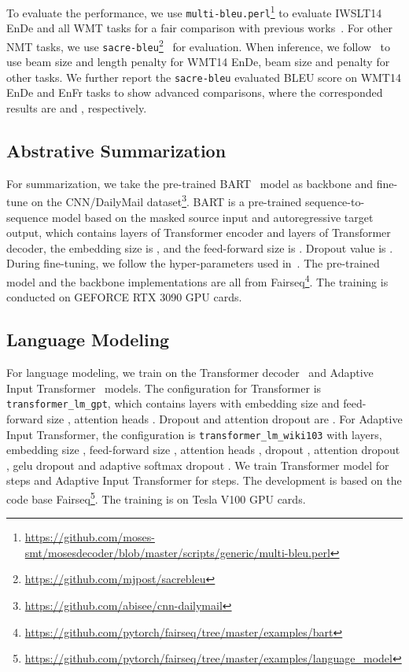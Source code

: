 \documentclass{article}
\begin{document}
To evaluate the performance, we use \texttt{multi-bleu.perl}\footnote{\url{https://github.com/moses-smt/mosesdecoder/blob/master/scripts/generic/multi-bleu.perl}} to evaluate IWSLT14 EnDe and all WMT tasks for a fair comparison with previous works~\cite{zhu2019incorporating,ott2018scaling}. For other NMT tasks, we use \texttt{sacre-bleu}\footnote{\url{https://github.com/mjpost/sacrebleu}}~\cite{post2018call} for evaluation. When inference, we follow~\cite{vaswani2017attention} to use beam size  and length penalty  for WMT14 EnDe, beam size  and penalty  for other tasks. We further report the \texttt{sacre-bleu} evaluated BLEU score on WMT14 EnDe and EnFr tasks to show advanced comparisons, where the corresponded results are  and , respectively. 

\subsection{Abstrative Summarization}
For summarization, we take the pre-trained BART~\cite{lewis2020bart} model as backbone and fine-tune on the CNN/DailyMail dataset\footnote{\url{https://github.com/abisee/cnn-dailymail}}. BART is a pre-trained sequence-to-sequence model based on the masked source input and autoregressive target output, which contains  layers of Transformer encoder and  layers of Transformer decoder, the embedding size is , and the feed-forward size is . Dropout value is . During fine-tuning, we follow the hyper-parameters used in~\cite{lewis2020bart}. The pre-trained model and the backbone implementations are all from Fairseq\footnote{\url{https://github.com/pytorch/fairseq/tree/master/examples/bart}}. The training is conducted on  GEFORCE RTX 3090 GPU cards.

\subsection{Language Modeling}
For language modeling, we train on the Transformer decoder~\cite{vaswani2017attention} and Adaptive Input Transformer~\cite{baevski2018adaptive} models. The configuration for Transformer is \texttt{transformer\_lm\_gpt}, which contains  layers with embedding size  and feed-forward size , attention heads . Dropout and attention dropout are . For Adaptive Input Transformer, the configuration is \texttt{transformer\_lm\_wiki103} with  layers, embedding size , feed-forward size , attention heads , dropout , attention dropout , gelu dropout  and adaptive softmax dropout . We train Transformer model for  steps and Adaptive Input Transformer for  steps. 
The development is based on the code base Fairseq\footnote{\url{https://github.com/pytorch/fairseq/tree/master/examples/language_model}}. The training is on  Tesla V100 GPU cards.
\end{document}
